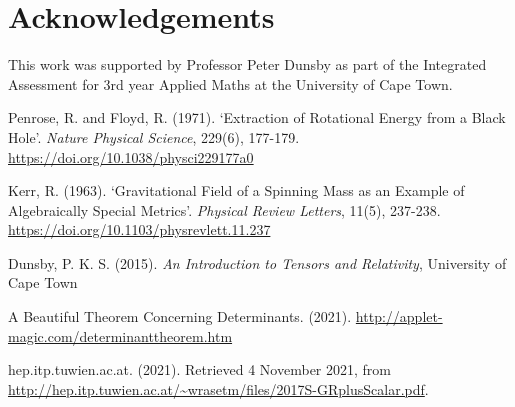 \documentclass[11pt]{article}
\numberwithin{equation}{section}
\numberwithin{figure}{section}
\numberwithin{table}{section}
\begin{document}
\section*{Acknowledgements}
This work was supported by Professor Peter Dunsby as part of the Integrated Assessment for 3rd year Applied Maths at the University of Cape Town.


\begin{thebibliography}{9}
    Penrose, R. and Floyd, R. (1971). `Extraction of Rotational Energy from a Black Hole'. \textit{Nature Physical Science}, 229(6), 177-179. \url{https://doi.org/10.1038/physci229177a0}

    Kerr, R. (1963). `Gravitational Field of a Spinning Mass as an Example of Algebraically Special Metrics'. \textit{Physical Review Letters}, 11(5), 237-238. \url{https://doi.org/10.1103/physrevlett.11.237}
    
    Dunsby, P. K. S. (2015). \textit{An Introduction to Tensors and Relativity}, University of Cape Town

    A Beautiful Theorem Concerning Determinants. (2021). \url{http://applet-magic.com/determinanttheorem.htm}

    hep.itp.tuwien.ac.at. (2021). Retrieved 4 November 2021, from \url{http://hep.itp.tuwien.ac.at/~wrasetm/files/2017S-GRplusScalar.pdf}.
\end{thebibliography}
    
\end{document}
